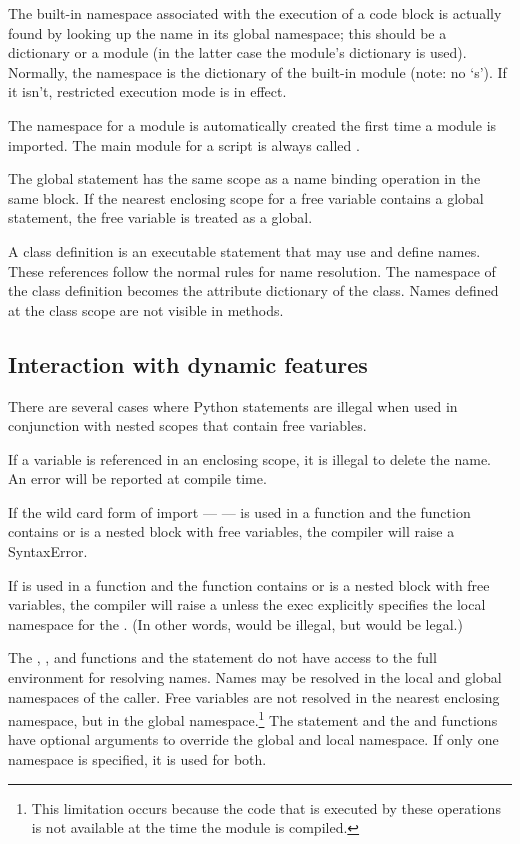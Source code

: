 The built-in namespace associated with the execution of a code block
is actually found by looking up the name  in its
global namespace; this should be a dictionary or a module (in the
latter case the module's dictionary is used).  Normally, the
 namespace is the dictionary of the built-in module
 (note: no `s').  If it isn't, restricted
execution mode is in effect.

The namespace for a module is automatically created the first time a
module is imported.  The main module for a script is always called
.

The global statement has the same scope as a name binding operation
in the same block.  If the nearest enclosing scope for a free variable
contains a global statement, the free variable is treated as a global.

A class definition is an executable statement that may use and define
names.  These references follow the normal rules for name resolution.
The namespace of the class definition becomes the attribute dictionary
of the class.  Names defined at the class scope are not visible in
methods. 

\subsection{Interaction with dynamic features \label{dynamic-features}}

There are several cases where Python statements are illegal when
used in conjunction with nested scopes that contain free
variables.

If a variable is referenced in an enclosing scope, it is illegal
to delete the name.  An error will be reported at compile time.

If the wild card form of import ---  --- is used in a
function and the function contains or is a nested block with free
variables, the compiler will raise a SyntaxError.

If  is used in a function and the function contains or
is a nested block with free variables, the compiler will raise a
 unless the exec explicitly specifies the local
namespace for the .  (In other words, 
would be illegal, but  would be legal.)

The , , and 
functions and the  statement do not have access to the
full environment for resolving names.  Names may be resolved in the
local and global namespaces of the caller.  Free variables are not
resolved in the nearest enclosing namespace, but in the global
namespace.\footnote{This limitation occurs because the code that is
    executed by these operations is not available at the time the
    module is compiled.}
The  statement and the  and
 functions have optional arguments to override
the global and local namespace.  If only one namespace is specified,
it is used for both.

